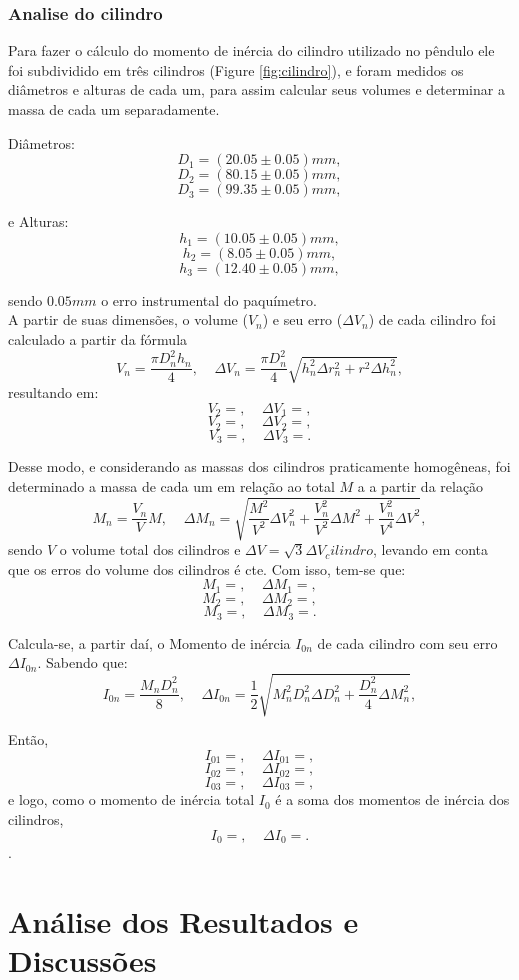 \documentclass[12pt,a4paper]{article}
\begin{document}
\subsubsection{Analise do cilindro}
Para fazer o cálculo do momento de inércia do cilindro utilizado no pêndulo ele foi subdividido em três cilindros (Figure \ref{fig:cilindro}), e foram medidos os diâmetros e alturas de cada um, para assim calcular seus volumes e determinar a massa de cada um separadamente.

Diâmetros:
$$ D_1 = (20.05 \pm 0.05)mm, $$
$$ D_2 = (80.15 \pm 0.05)mm, $$
$$ D_3 = (99.35 \pm 0.05)mm, $$

e Alturas:
$$ h_1 = (10.05 \pm 0.05)mm, $$
$$ h_2 = (8.05 \pm 0.05)mm, $$
$$ h_3 = (12.40 \pm 0.05)mm, $$

sendo $0.05mm$ o erro instrumental do paquímetro.\\

A partir de suas dimensões, o volume ($V_n$) e seu erro ($\Delta V_n$) de cada cilindro foi calculado a partir da fórmula
$$V_n = \frac{\pi D_n^2 h_n}{4}, \; \; \;  \; \Delta V_n = \frac {\pi D_n^2}{4} \sqrt{h_n^2 \Delta r_n^2 + r^2 \Delta h_n^2},$$
resultando em:
$$V_2 = , \; \; \; \; \Delta V_1 = ,$$
$$V_2 = , \; \; \; \; \Delta V_2 = ,$$ 
$$V_3 = , \; \; \; \; \Delta V_3 = .$$ 

Desse modo, e considerando as massas dos cilindros praticamente homogêneas, foi determinado a massa de cada um em relação ao total $M$ a a partir da relação
$$M_n = \frac{V_n}{V} M, \; \; \; \; \Delta M_n = \sqrt{\frac{M^2}{V^2} \Delta V_n^2 + \frac{V_n^2}{V^2} \Delta M^2 + \frac{V_n^2}{V^4} \Delta V^2},$$
sendo $V$ o volume total dos cilindros e $\Delta V = \sqrt{3} \Delta V_cilindro$, levando em conta que os erros do volume dos cilindros é cte.
Com isso, tem-se que:
$$M_1 = , \; \; \; \; \Delta M_1 = ,$$
$$M_2 = , \; \; \; \; \Delta M_2 = ,$$
$$M_3 = , \; \; \; \; \Delta M_3 = .$$

Calcula-se, a partir daí, o Momento de inércia $I_{0n}$ de cada cilindro com seu erro $\Delta I_{0n}$. Sabendo que:
$$I_{0n} = \frac{M_nD_n^2}{8}, \; \; \; \; \Delta I_{0n} = \frac {1}{2} \sqrt{M_n^2D_n^2 \Delta D_n^2 + \frac{D_n^2}{4} \Delta M_n^2},$$

Então,
$$I_{01} =, \; \; \; \; \Delta I_{01} = ,$$
$$I_{02} =, \; \; \; \; \Delta I_{02} = ,$$
$$I_{03} =, \; \; \; \; \Delta I_{03} = ,$$
e logo, como o momento de inércia total $I_0$ é a soma dos momentos de inércia dos cilindros,
$$I_0 = , \; \; \; \; \Delta I_0 = .$$.
\section{Análise dos Resultados e Discussões}
\end{document}

